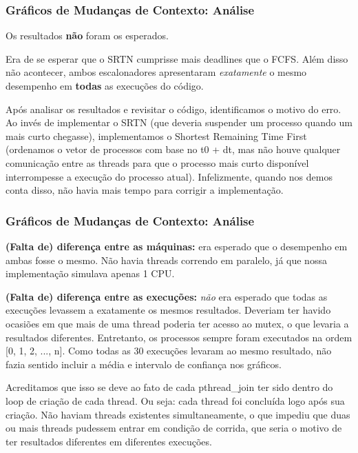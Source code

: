 \documentclass{beamer}
\begin{document}
\begin{frame}
\blindtext

\end{frame}

\begin{frame}
\frametitle{Gráficos de Mudanças de Contexto: Análise}

Os resultados \textbf{não} foram os esperados.

\item Era de se esperar que o SRTN cumprisse mais deadlines que o FCFS. Além disso não acontecer, ambos escalonadores apresentaram \textit{exatamente} o mesmo desempenho em \textbf{todas} as execuções do código. 

\item Após analisar os resultados e revisitar o código, identificamos o motivo do erro. Ao invés de implementar o SRTN (que deveria suspender um processo quando um mais curto chegasse), implementamos o Shortest Remaining Time First (ordenamos o vetor de processos com base no t0 + dt, mas não houve qualquer comunicação entre as threads para que o processo mais curto disponível interrompesse a execução do processo atual). Infelizmente, quando nos demos conta disso, não havia mais tempo para corrigir a implementação.

\end{frame}


\begin{frame}
\frametitle{Gráficos de Mudanças de Contexto: Análise}


\item \textbf{(Falta de) diferença entre as máquinas:} era esperado que o desempenho em ambas fosse o mesmo. Não havia threads correndo em paralelo, já que nossa implementação simulava apenas 1 CPU.

\item \textbf{(Falta de) diferença entre as execuções:} \textit{não} era esperado que todas as execuções levassem a exatamente os mesmos resultados. Deveriam ter havido ocasiões em que mais de uma thread poderia ter acesso ao mutex, o que levaria a resultados diferentes. Entretanto, os processos sempre foram executados na ordem [0, 1, 2, ..., n]. Como todas as 30 execuções levaram ao mesmo resultado, não fazia sentido incluir a média e intervalo de confiança nos gráficos.

\item Acreditamos que isso se deve ao fato de cada pthread\_join ter sido dentro do loop de criação de cada thread. Ou seja: cada thread foi concluída logo após sua criação. Não haviam threads existentes simultaneamente, o que impediu que duas ou mais threads pudessem entrar em condição de corrida, que seria o motivo de ter resultados diferentes em diferentes execuções.


\end{frame}
\end{document}
